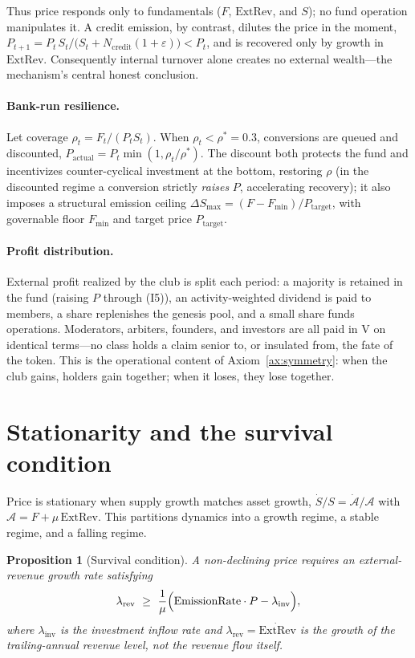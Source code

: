 \documentclass[11pt]{article}
\theoremstyle{plain}
\newtheorem{proposition}{Proposition}
\theoremstyle{definition}
\theoremstyle{remark}
\newcommand{\V}{\mathrm{V}}
\newcommand{\ExtRev}{\mathrm{ExtRev}}
\begin{document}
Thus price responds only to fundamentals ($F$, $\ExtRev$, and $S$); no fund operation manipulates it. A credit emission, by contrast, dilutes the price in the moment, $P_{t+1} = P_t\, S_t / \bigl(S_t + N_{\mathrm{credit}}(1+\varepsilon)\bigr) < P_t$, and is recovered only by growth in $\ExtRev$. Consequently internal turnover alone creates no external wealth---the mechanism's central honest conclusion.

\paragraph{Bank-run resilience.} Let coverage $\rho_t = F_t/(P_t S_t)$. When $\rho_t < \rho^* = 0.3$, conversions are queued and discounted, $P_{\mathrm{actual}} = P_t \min(1, \rho_t/\rho^*)$. The discount both protects the fund and incentivizes counter-cyclical investment at the bottom, restoring $\rho$ (in the discounted regime a conversion strictly \emph{raises} $P$, accelerating recovery); it also imposes a structural emission ceiling $\Delta S_{\max} = (F - F_{\min})/P_{\mathrm{target}}$, with governable floor $F_{\min}$ and target price $P_{\mathrm{target}}$.

\paragraph{Profit distribution.} External profit realized by the club is split each period: a majority is retained in the fund (raising $P$ through (I5)), an activity-weighted dividend is paid to members, a share replenishes the genesis pool, and a small share funds operations. Moderators, arbiters, founders, and investors are all paid in $\V$ on identical terms---no class holds a claim senior to, or insulated from, the fate of the token. This is the operational content of Axiom~\ref{ax:symmetry}: when the club gains, holders gain together; when it loses, they lose together.

\section{Stationarity and the survival condition}

Price is stationary when supply growth matches asset growth, $\dot S/S = \dot{\mathcal{A}}/\mathcal{A}$ with $\mathcal{A} = F + \mu\,\ExtRev$. This partitions dynamics into a growth regime, a stable regime, and a falling regime.

\begin{proposition}[Survival condition]\label{prop:survival}
A non-declining price requires an external-revenue growth rate satisfying
\[
\lambda_{\mathrm{rev}} \ \ge\ \frac{1}{\mu}\Bigl(\mathrm{EmissionRate}\cdot P - \lambda_{\mathrm{inv}}\Bigr),
\]
where $\lambda_{\mathrm{inv}}$ is the investment inflow rate and $\lambda_{\mathrm{rev}}=\dot{\ExtRev}$ is the \emph{growth} of the trailing-annual revenue level, not the revenue flow itself.
\end{proposition}
\end{document}
